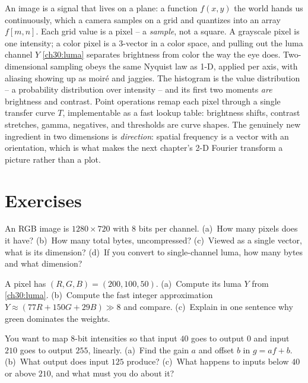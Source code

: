 An image is a signal that lives on a plane: a function $f(x,y)$ the world hands us
continuously, which a camera samples on a grid and quantizes into an array
$f[m,n]$. Each grid value is a pixel -- a \emph{sample}, not a square. A grayscale
pixel is one intensity; a color pixel is a 3-vector in a color space, and pulling
out the luma channel $Y$ \eqref{ch30:luma} separates brightness from color the way
the eye does. Two-dimensional sampling obeys the same Nyquist law as 1-D, applied
per axis, with aliasing showing up as moir\'e and jaggies. The histogram is the
value distribution -- a probability distribution over intensity -- and its first
two moments \emph{are} brightness and contrast. Point operations remap each pixel
through a single transfer curve $T$, implementable as a fast lookup table:
brightness shifts, contrast stretches, gamma, negatives, and thresholds are
curve shapes. The genuinely new ingredient in two dimensions is
\emph{direction}: spatial frequency is a vector with an orientation, which is what
makes the next chapter's 2-D Fourier transform a picture rather than a plot.

\section{Exercises}
\label{ch30:exercises}

\begin{exercise}
\label{ch30:ex-vector}
An RGB image is $1280\times 720$ with 8 bits per channel. (a)~How many pixels does
it have? (b)~How many total bytes, uncompressed? (c)~Viewed as a single vector,
what is its dimension? (d)~If you convert to single-channel luma, how many bytes
and what dimension?
\end{exercise}

\begin{exercise}
\label{ch30:ex-luma}
A pixel has $(R,G,B)=(200,100,50)$. (a)~Compute its luma $Y$ from
\eqref{ch30:luma}. (b)~Compute the fast integer approximation
$Y\approx(77R+150G+29B)\gg 8$ and compare. (c)~Explain in one sentence why green
dominates the weights.
\end{exercise}

\begin{exercise}
\label{ch30:ex-affine}
You want to map 8-bit intensities so that input $40$ goes to output $0$ and input
$210$ goes to output $255$, linearly. (a)~Find the gain $a$ and offset $b$ in
$g=af+b$. (b)~What output does input $125$ produce? (c)~What happens to inputs
below $40$ or above $210$, and what must you do about it?
\end{exercise}

